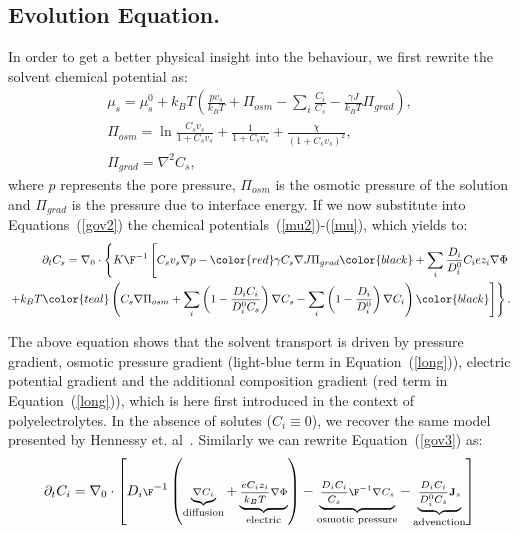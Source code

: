 
\subsection{Evolution Equation.}

In order to get a better physical insight into the behaviour, we first rewrite the solvent chemical potential as:
\begin{gather}
\mu_s = \mu^0_s + k_B T \left(\frac{p v_s}{k_BT} +\Pi_{osm}-\sum_i \frac{C_i}{C_s} -\frac{\gamma J}{k_B T}\Pi_{grad}\right)\label{mu2},\\
\Pi_{osm}=\ln \frac{C_s v_s}{1+C_s v_s} + \frac{1}{1+C_sv_s}+\frac{\chi}{(1+C_s v_s)^2},\\
\Pi_{grad} = \nabla^2 C_s,
\end{gather}
where $p$ represents the pore pressure, $\Pi_{osm}$ is the osmotic pressure of the solution and $\Pi_{grad}$ is the pressure due to interface energy. If we now substitute into Equations~(\ref{gov2}) the chemical potentials~(\ref{mu2})-(\ref{mu}), which yields to:
\begin{equation}
\begin{aligned}
\partial_t C_s=\nabla_0 \cdot\left\{K\F^{-1}\left[C_s v_s\nabla p - \color{red}\gamma C_s \nabla J\Pi_{grad}\color{black}+\sum_i \frac{D_i}{D^0_i} C_i e z_i \nabla \Phi\right.\right.\\
\left.\left.+ k_B T\color{teal} \left(C_s \nabla \Pi_{osm}+ \sum_i\left(1-\frac{D_iC_i}{D^0_iC_s}\right) \nabla C_s - \sum_i\left(1-\frac{D_i}{D^0_i}\right) \nabla C_i \right)\color{black}\right]\right\}.\label{long}
\end{aligned}
\end{equation}

The above equation shows that the solvent transport is driven by pressure gradient, osmotic pressure gradient (light-blue term in Equation~(\ref{long})), electric potential gradient and the additional composition gradient (red term in Equation~(\ref{long})), which is here first introduced in the context of polyelectrolytes. In the absence of solutes ($C_i\equiv 0$), we recover the same model presented by Hennessy et. al~\cite{sarah}. 
Similarly we can rewrite Equation~(\ref{gov3}) as:
\begin{equation}
\scriptsize
\partial_t C_i = \nabla_0 \cdot \left[D_i\F^{-1}\left(\underbrace{\nabla C_i}_{\text{diffusion}} +\underbrace{\frac{eC_iz_i}{k_B T} \nabla \Phi}_{\text{electric}}\right)-\underbrace{\frac{D_i C_i}{C_s}\F^{-1}\nabla C_s}_{\text{osmotic pressure}}-\underbrace{\frac{D_i C_i}{D^0_iC_s}\mathbf{J}_s}_{\text{advenction}}\right]\label{long2}
\end{equation}

